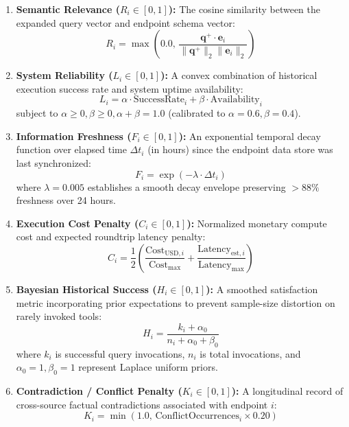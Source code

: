 \begin{enumerate}
    \item \textbf{Semantic Relevance ($R_i \in [0, 1]$):} The cosine similarity between the expanded query vector and endpoint schema vector:
    \begin{equation}
        R_i = \max\left( 0.0, \, \frac{\mathbf{q}^+ \cdot \mathbf{e}_i}{\|\mathbf{q}^+\|_2 \|\mathbf{e}_i\|_2} \right)
    \end{equation}
    \item \textbf{System Reliability ($L_i \in [0, 1]$):} A convex combination of historical execution success rate and system uptime availability:
    \begin{equation}
        L_i = \alpha \cdot \text{SuccessRate}_i + \beta \cdot \text{Availability}_i
        \label{eq:reliability_def}
    \end{equation}
    subject to $\alpha \ge 0, \beta \ge 0, \alpha + \beta = 1.0$ (calibrated to $\alpha = 0.6, \beta = 0.4$).
    \item \textbf{Information Freshness ($F_i \in [0, 1]$):} An exponential temporal decay function over elapsed time $\Delta t_i$ (in hours) since the endpoint data store was last synchronized:
    \begin{equation}
        F_i = \exp\left( -\lambda \cdot \Delta t_i \right)
        \label{eq:freshness_def}
    \end{equation}
    where $\lambda = 0.005$ establishes a smooth decay envelope preserving $>88\%$ freshness over 24 hours.
    \item \textbf{Execution Cost Penalty ($C_i \in [0, 1]$):} Normalized monetary compute cost and expected roundtrip latency penalty:
    \begin{equation}
        C_i = \frac{1}{2} \left( \frac{\text{Cost}_{\text{USD}, i}}{\text{Cost}_{\text{max}}} + \frac{\text{Latency}_{\text{est}, i}}{\text{Latency}_{\text{max}}} \right)
    \end{equation}
    \item \textbf{Bayesian Historical Success ($H_i \in [0, 1]$):} A smoothed satisfaction metric incorporating prior expectations to prevent sample-size distortion on rarely invoked tools:
    \begin{equation}
        H_i = \frac{k_i + \alpha_0}{n_i + \alpha_0 + \beta_0}
        \label{eq:bayesian_success}
    \end{equation}
    where $k_i$ is successful query invocations, $n_i$ is total invocations, and $\alpha_0 = 1, \beta_0 = 1$ represent Laplace uniform priors.
    \item \textbf{Contradiction / Conflict Penalty ($K_i \in [0, 1]$):} A longitudinal record of cross-source factual contradictions associated with endpoint $i$:
    \begin{equation}
        K_i = \min\left( 1.0, \, \text{ConflictOccurrences}_i \times 0.20 \right)
    \end{equation}
\end{enumerate}

